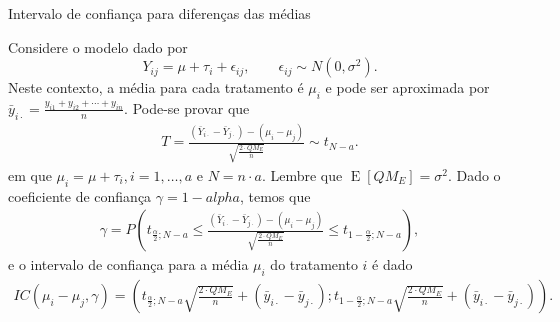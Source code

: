 \documentclass[8pt]{beamer}
\DeclareMathOperator{\espe}{E}
\begin{document}
\begin{frame}{Intervalo de confiança para diferenças das médias}

Considere o modelo dado por
$$Y_{ij} = \mu + \tau_i  + \epsilon_{ij}, \qquad \epsilon_{ij} \sim N(0, \sigma^2).$$
Neste contexto, a média para cada tratamento é $\mu_i$ e pode ser aproximada por $\bar{y}_{i\cdot} = \frac{y_{i1} + y_{i2} + \cdots + y_{in}}{n}$. Pode-se provar que
\begin{align*}
T = \frac{(\bar{Y}_{i\cdot} - \bar{Y}_{j\cdot}) - (\mu_i - \mu_j)}{\sqrt{\frac{2\cdot QM_E}{n}}} \sim  t_{N - a}.
\end{align*}
em que $\mu_i=\mu+\tau_i,i =1, \dots, a$ e $N = n \cdot a$. Lembre que $\espe\left[QM_E\right] = \sigma^2$. Dado o coeficiente de confiança $\gamma=1-alpha$, temos que
\begin{align*}
\gamma = P\left( t_{\frac{\alpha}{2};N - a} \leq \frac{(\bar{Y}_{i\cdot} - \bar{Y}_{j\cdot}) - (\mu_i - \mu_j)}{\sqrt{\frac{2\cdot QM_E}{n}}} \leq t_{1-\frac{\alpha}{2};N - a}  \right),
\end{align*}
e o intervalo de confiança para a média $\mu_i$ do tratamento  $i$ é dado
\begin{align*}
IC(\mu_i - \mu_j, \gamma) = \left( t_{\frac{\alpha}{2};N - a} \sqrt{\frac{2\cdot QM_E}{n}} + (\bar{y}_{i\cdot} - \bar{y}_{j\cdot}); t_{1-\frac{\alpha}{2};N - a} \sqrt{\frac{2\cdot QM_E}{n}} + (\bar{y}_{i\cdot} - \bar{y}_{j\cdot}) \right).
\end{align*}

\end{frame}
\end{document}
